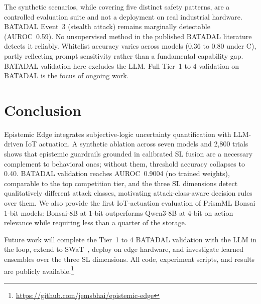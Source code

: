 \documentclass[conference]{IEEEtran}
\begin{document}
The synthetic scenarios, while covering five distinct safety patterns, are a controlled evaluation suite and not a deployment on real industrial hardware.
BATADAL Event~3 (stealth attack) remains marginally detectable (AUROC~0.59). No unsupervised method in the published BATADAL literature detects it reliably.
Whitelist accuracy varies across models (0.36 to 0.80 under C), partly reflecting prompt sensitivity rather than a fundamental capability gap.
BATADAL validation here excludes the LLM. Full Tier~1 to 4 validation on BATADAL is the focus of ongoing work.

\section{Conclusion}

Epistemic Edge integrates subjective-logic uncertainty quantification with LLM-driven IoT actuation. A synthetic ablation across seven models and 2{,}800 trials shows that epistemic guardrails grounded in calibrated SL fusion are a necessary complement to behavioral ones; without them, threshold accuracy collapses to 0.40. BATADAL validation reaches AUROC~0.9004 (no trained weights), comparable to the top competition tier, and the three SL dimensions detect qualitatively different attack classes, motivating attack-class-aware decision rules over them. We also provide the first IoT-actuation evaluation of PrismML Bonsai 1-bit models: Bonsai-8B at 1-bit outperforms Qwen3-8B at 4-bit on action relevance while requiring less than a quarter of the storage.

Future work will complete the Tier~1 to 4 BATADAL validation with the LLM in the loop, extend to SWaT~\cite{goh2017swat}, deploy on edge hardware, and investigate learned ensembles over the three SL dimensions. All code, experiment scripts, and results are publicly available.\footnote{\url{https://github.com/jemsbhai/epistemic-edge}}

\balance


\end{document}
